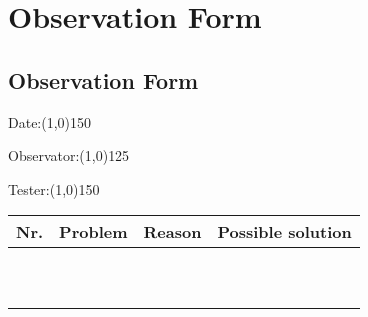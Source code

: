\chapter{Observation Form}
\newpage
\section*{Observation Form}

\indent

Date:\line(1,0){150}
\vspace{5mm}

Observator:\line(1,0){125}
\vspace{5mm}

Tester:\line(1,0){150}
\vspace{5mm}

\begin{table}[h]
	\centering
	\begin{tabular}{| l | p{4cm} | p{4cm} | p{4cm} |}
	\hline
	{\bf Nr.} & {\bf Problem} & {\bf Reason} & {\bf Possible solution} \\ \hline
	& & & \\[1cm] \hline
	& & & \\[1cm] \hline 
	& & & \\[1cm] \hline 
	& & & \\[1cm] \hline 
	& & & \\[1cm] \hline 
	& & & \\[1cm] \hline
	& & & \\[1cm] \hline 
	& & & \\[1cm] \hline 
	& & & \\[1cm] \hline 
	& & & \\[1cm] \hline 
	\end{tabular}
\end{table}